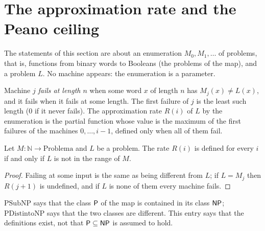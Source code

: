 \section{The approximation rate and the Peano ceiling}
\label{sec:structure-rate}

The statements of this section are about an enumeration $M_0, M_1, \dots$ of problems, that is,
functions from binary words to Booleans (the problems of the map), and a problem $L$. No machine
appears: the enumeration is a parameter.

\begin{definition}
  \label{def:structure-tasa}
  \leanok
  Machine $j$ \emph{fails at length $n$} when some word $x$ of length $n$ has $M_j(x) \neq L(x)$, and
  it fails when it fails at some length. The first failure of $j$ is the least such length ($0$ if it
  never fails). The approximation rate $R(i)$ of $L$ by the enumeration is the partial function whose
  value is the maximum of the first failures of the machines $0, \dots, i - 1$, defined only when all
  of them fail.
\end{definition}

\begin{lemma}
  \label{lem:structure-tasa-total}
  \leanok
  Let $M : \mathbb{N} \to \mathrm{Problema}$ and $L$ be a problem. The rate $R(i)$ is defined for every $i$
  if and only if $L$ is not in the range of $M$.
\end{lemma}

\begin{proof}
  \leanok
  Failing at some input is the same as being different from $L$; if $L = M_j$ then $R(j + 1)$ is
  undefined, and if $L$ is none of them every machine fails.
\end{proof}

\begin{definition}
  \label{def:structure-psubnp}
  \leanok
  $\mathrm{PSubNP}$ says that the class $\mathsf{P}$ of the map is contained in its class $\mathsf{NP}$;
  $\mathrm{PDistintoNP}$ says that the two classes are different. This entry says that the
  definitions exist, not that $\mathsf{P} \subseteq \mathsf{NP}$ is assumed to hold.
  \own{}
\end{definition}

